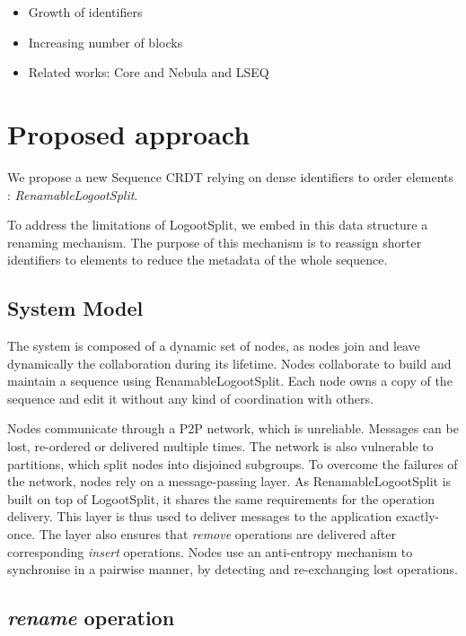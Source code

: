 \documentclass[sigplan,10pt]{acmart}
\begin{document}
\begin{itemize}
    \item Growth of identifiers
    \item Increasing number of blocks
    \item Related works: Core and Nebula \cite{letia:hal-01248270,zawirski:hal-01248197} and LSEQ \cite{nedelec_2013_lseq,doi:10.1002/cpe.4108}
\end{itemize}

\section{Proposed approach}

We propose a new Sequence \ac{CRDT} relying on dense identifiers to order elements : \emph{RenamableLogootSplit}.

To address the limitations of LogootSplit, we embed in this data structure a renaming mechanism.
The purpose of this mechanism is to reassign shorter identifiers to elements to reduce the metadata of the whole sequence.

\subsection{System Model}

The system is composed of a dynamic set of nodes, as nodes join and leave dynamically the collaboration during its lifetime.
Nodes collaborate to build and maintain a sequence using RenamableLogootSplit.
Each node owns a copy of the sequence and edit it without any kind of coordination with others.

Nodes communicate through a \ac{P2P} network, which is unreliable.
Messages can be lost, re-ordered or delivered multiple times.
The network is also vulnerable to partitions, which split nodes into disjoined subgroups.
To overcome the failures of the network, nodes rely on a message-passing layer.
As RenamableLogootSplit is built on top of LogootSplit, it shares the same requirements for the operation delivery.
This layer is thus used to deliver messages to the application exactly-once.
The layer also ensures that \emph{remove} operations are delivered after corresponding \emph{insert} operations.
Nodes use an anti-entropy mechanism to synchronise in a pairwise manner, by detecting and re-exchanging lost operations.

\subsection{\emph{rename} operation}
\end{document}
